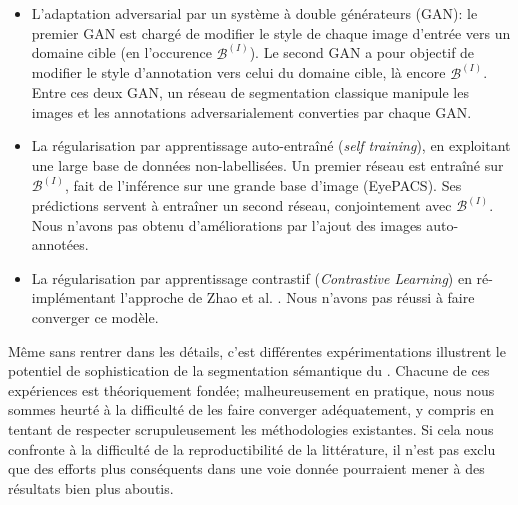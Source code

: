 \begin{itemize}
	\item L'adaptation adversarial par un système à double générateurs (GAN): le premier GAN est chargé de modifier le style de chaque image d'entrée vers un domaine cible (en l'occurence $\mathcal{B}^{(I)}$). Le second GAN a pour objectif de modifier le style d'annotation vers celui du domaine cible, là encore $\mathcal{B}^{(I)}$. Entre ces deux GAN, un réseau de segmentation classique manipule les images et les annotations adversarialement converties par chaque GAN. 
	\item La régularisation par apprentissage auto-entraîné (\textit{self training}), en exploitant une large base de données non-labellisées. Un premier réseau est entraîné sur $\mathcal{B}^{(I)}$, fait de l'inférence sur une grande base d'image (EyePACS). Ses prédictions servent à entraîner un second réseau, conjointement avec $\mathcal{B}^{(I)}$. Nous n'avons pas obtenu d'améliorations par l'ajout des images auto-annotées.
	\item La régularisation par apprentissage contrastif (\textit{Contrastive Learning}) en ré-implémentant l'approche de Zhao et al. \cite{zhaoContrastiveLearningLabel2021}. Nous n'avons pas réussi à faire converger ce modèle.
\end{itemize}
Même sans rentrer dans les détails, c'est différentes expérimentations illustrent le potentiel de sophistication de la segmentation sémantique du \fundus{}. Chacune de ces expériences est théoriquement fondée; malheureusement en pratique, nous nous sommes heurté à la difficulté de les faire converger adéquatement, y compris en tentant de respecter scrupuleusement les méthodologies existantes. Si cela nous confronte à la difficulté de la reproductibilité de la littérature, il n'est pas exclu que des efforts plus conséquents dans une voie donnée pourraient mener à des résultats bien plus aboutis.
